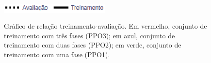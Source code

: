 
\begin{figure}[hb]
 \begin{center}
 \subfigure
  {
    \centering\includegraphics[width=0.49\textwidth]{./fig/legend}
  } 
  \captionsetup{width=1\textwidth}
  \caption[Gráfico de relação treinamento-avaliação.]
  {Gráfico de relação treinamento-avaliação. Em vermelho, conjunto de treinamento com três fases (PPO3); em azul, conjunto de treinamento com duas fases (PPO2); em verde, conjunto de treinamento com uma fase (PPO1).}
  \label{fig:resultados}
\end{center}
\end{figure}
